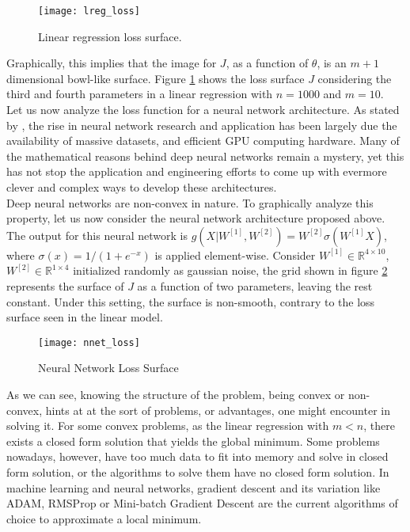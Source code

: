 \documentclass{article}
\newcommand{\rnums}{\mathbb{R}}
\begin{document}
	\begin{figure}[h!]
		\centering
		\texttt{[image: lreg\_loss]}
		\caption{Linear regression loss surface.}
		\label{fig:convex_loss}
	\end{figure}
	
	
	Graphically, this implies that the image for $J$, as a function of $\theta$, is an $m + 1$ dimensional bowl-like surface. Figure \ref{fig:convex_loss} shows the loss surface $J$ considering the third and fourth parameters in a linear regression with $n=1000$ and $m=10$.\\
	
	Let us now analyze the loss function for a neural network architecture. As stated by \cite{vidal-et-al}, the rise in neural network research and application has been largely due the availability of massive datasets, and efficient GPU computing hardware. Many of the mathematical reasons behind deep neural networks remain a mystery, yet this has not stop the application and engineering efforts to come up with evermore clever and complex ways to develop these architectures.\\
	
	Deep neural networks are non-convex in nature. To graphically analyze this property, let us now consider the neural network architecture proposed above. The output for this neural network is $g(X|W^{[1]}, W^{[2]}) = W^{[2]}\sigma\left(W^{[1]} X\right)$, where $\sigma(x) = 1 / (1 + e^{-x})$ is applied element-wise. Consider $W^{[1]} \in \rnums^{4\times 10}$, $W^{[2]} \in \rnums^{1\times 4}$ initialized randomly as gaussian noise, the grid shown in figure \ref{fig:nonconvex_loss} represents the surface of $J$ as a function of two parameters, leaving the rest constant. Under this setting, the surface is non-smooth, contrary to the loss surface seen in the linear model.\\
		
	\begin{figure}[h!]
		\centering
		\texttt{[image: nnet\_loss]}
		\caption{Neural Network Loss Surface}
		\label{fig:nonconvex_loss}
	\end{figure}
	
	
	As we can see, knowing the structure of the problem, being convex or non-convex, hints at at the sort of problems, or advantages, one might encounter in solving it. For some convex problems, as  the linear regression with $m < n$, there exists a closed form solution that yields the global minimum. Some problems nowadays, however, have too much data to fit into memory and solve in closed form solution, or the algorithms to solve them have no closed form solution. In machine learning and neural networks, gradient descent and its variation like ADAM, RMSProp or Mini-batch Gradient Descent are the current algorithms of choice to approximate a local minimum.\\
	
\end{document}
